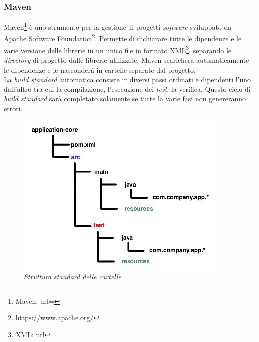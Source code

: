 \subsubsection{Maven}
Maven\footnote{Maven: url= } è uno strumento per la gestione di progetti \textit{software} sviluppato da Apache Software Foundation\footnote{https://www.apache.org/}. Permette di dichiarare tutte le dipendenze e le varie versione delle librerie in un unico file in formato XML\footnote{XML: url}, separando le \textit{directory} di progetto dalle librerie utilizzate. Maven scaricherà automaticamente le dipendenze e le nasconderà in cartelle separate dal progetto.\\
La \textit{build standard} automatica consiste in diversi passi ordinati e dipendenti l'uno dall'altro tra cui la compilazione, l'esecuzione dei \textit{test}, la verifica. Questo ciclo di \textit{build standard} sarà completato solamente se tutte la varie fasi non genereranno errori.
\begin{figure}[h!]
	\centering
	\includegraphics[scale=0.5]{immagini/maven.jpg}
	\caption{\textit{Struttura standard delle cartelle} }
\end{figure}
